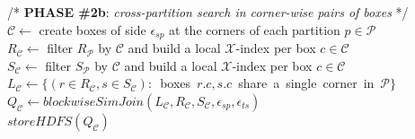\begin{algorithm}[!ht]
\begin{footnotesize}
\nonl /* {\bf PHASE \#2b}: {\em cross-partition search in corner-wise pairs of boxes} */ \\
  
  $\mathcal{C} \leftarrow$ create boxes of side $\epsilon_{sp}$ at the corners of each partition $p \in \mathcal{P}$ \\
  $R_{\mathcal{C}} \leftarrow $ filter $R_{\mathcal{P}}$ by $\mathcal{C}$ and build a local $\mathcal{X}$-index per box $c \in \mathcal{C}$\\
  $S_{\mathcal{C}} \leftarrow $ filter $S_{\mathcal{P}}$ by $\mathcal{C}$ and build a local $\mathcal{X}$-index per box $c \in \mathcal{C}$\\
  \mbox{$L_{\mathcal{C}} \leftarrow \{ ( r \in R_{\mathcal{C}}, s \in S_{\mathcal{C}}):$ boxes $r.c, s.c$ share a single corner in  $\mathcal{P}\}$} \\
  $Q_{\mathcal{C}} \leftarrow blockwiseSimJoin(L_{\mathcal{C}}, R_{\mathcal{C}}, S_{\mathcal{C}},\epsilon_{sp}, \epsilon_{ts})$ \\  
  $storeHDFS(Q_{\mathcal{C}})$   \\

  \vspace{6pt}
  \end{footnotesize}
  \caption{$SimJoinMR(\mathcal{T}_{R},\mathcal{T}_{S}, \epsilon_{sp}, \epsilon_{ts}, \mathcal{X} )$}
  \label{alg:simjoin_mr}
\end{algorithm}

